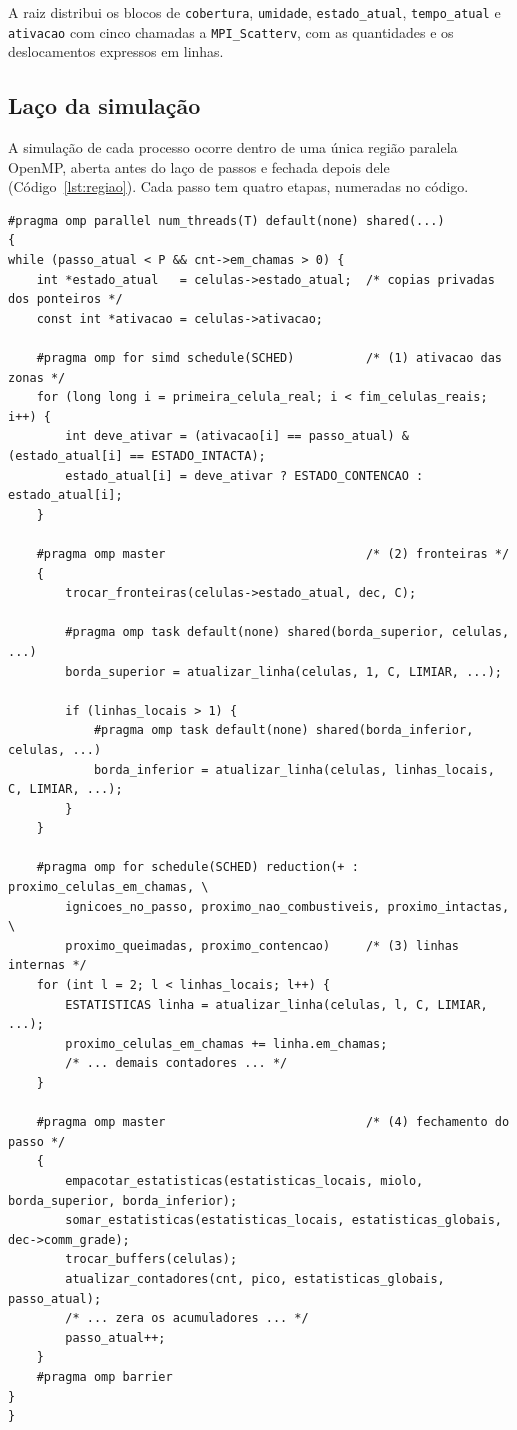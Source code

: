 \documentclass[11pt,a4paper]{article}
\begin{document}
A raiz distribui os blocos de \texttt{cobertura}, \texttt{umidade}, \texttt{estado\_atual}, \texttt{tempo\_atual} e \texttt{ativacao} com cinco chamadas a \texttt{MPI\_Scatterv}, com as quantidades e os deslocamentos expressos em linhas.

\subsection{Laço da simulação}
\label{sec:laco}

A simulação de cada processo ocorre dentro de uma única região paralela OpenMP, aberta antes do laço de passos e fechada depois dele (Código~\ref{lst:regiao}). Cada passo tem quatro etapas, numeradas no código.

\begin{lstlisting}[caption={Estrutura da região paralela persistente de \texttt{fire\_mpi\_omp.c} (lista de variáveis compartilhadas omitida).},label={lst:regiao}]
#pragma omp parallel num_threads(T) default(none) shared(...)
{
while (passo_atual < P && cnt->em_chamas > 0) {
    int *estado_atual   = celulas->estado_atual;  /* copias privadas dos ponteiros */
    const int *ativacao = celulas->ativacao;

    #pragma omp for simd schedule(SCHED)          /* (1) ativacao das zonas */
    for (long long i = primeira_celula_real; i < fim_celulas_reais; i++) {
        int deve_ativar = (ativacao[i] == passo_atual) & (estado_atual[i] == ESTADO_INTACTA);
        estado_atual[i] = deve_ativar ? ESTADO_CONTENCAO : estado_atual[i];
    }

    #pragma omp master                            /* (2) fronteiras */
    {
        trocar_fronteiras(celulas->estado_atual, dec, C);

        #pragma omp task default(none) shared(borda_superior, celulas, ...)
        borda_superior = atualizar_linha(celulas, 1, C, LIMIAR, ...);

        if (linhas_locais > 1) {
            #pragma omp task default(none) shared(borda_inferior, celulas, ...)
            borda_inferior = atualizar_linha(celulas, linhas_locais, C, LIMIAR, ...);
        }
    }

    #pragma omp for schedule(SCHED) reduction(+ : proximo_celulas_em_chamas, \
        ignicoes_no_passo, proximo_nao_combustiveis, proximo_intactas,       \
        proximo_queimadas, proximo_contencao)     /* (3) linhas internas */
    for (int l = 2; l < linhas_locais; l++) {
        ESTATISTICAS linha = atualizar_linha(celulas, l, C, LIMIAR, ...);
        proximo_celulas_em_chamas += linha.em_chamas;
        /* ... demais contadores ... */
    }

    #pragma omp master                            /* (4) fechamento do passo */
    {
        empacotar_estatisticas(estatisticas_locais, miolo, borda_superior, borda_inferior);
        somar_estatisticas(estatisticas_locais, estatisticas_globais, dec->comm_grade);
        trocar_buffers(celulas);
        atualizar_contadores(cnt, pico, estatisticas_globais, passo_atual);
        /* ... zera os acumuladores ... */
        passo_atual++;
    }
    #pragma omp barrier
}
}
\end{lstlisting}
\end{document}
